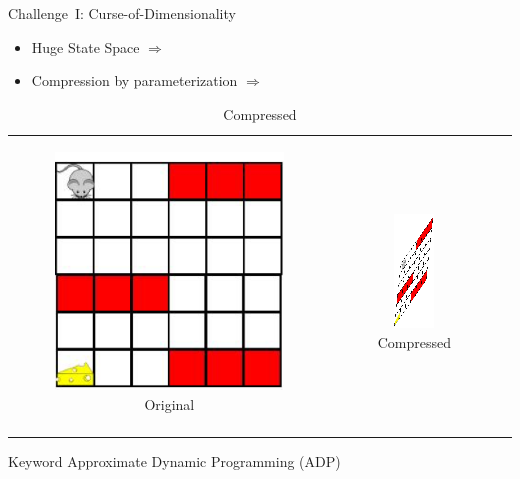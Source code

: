 \documentclass[10pt]{beamer}
\begin{document}
\begin{frame}[fragile]{Challenge~I: {Curse-of-Dimensionality}}

\begin{itemize}
\item Huge State Space $\Rightarrow$  {\color{orange}{Exact Decision $u^*$ not possible}}
\item Compression by parameterization $\Rightarrow$ {}
\end{itemize}

\begin{table}
\begin{tabular}{ccc}

\begin{minipage}{0.3\textwidth}
\begin{figure}
\includegraphics[scale=0.4]{mouse-single.png}
\caption*{Original}
\end{figure}
\end{minipage}
&
\begin{minipage}{0.3\textwidth}
\begin{figure}
\includegraphics[scale=0.4]{compress-mouse.png}
\caption*{Compressed }
\end{figure}
\end{minipage}
&
\begin{minipage}{0.3\textwidth}
\begin{block}{Open Question}
{\color{orange}{How bad is $\tu$ in comparison to $u^*$?}}\\
\end{block}
\end{minipage}

\end{tabular}
\end{table}


\begin{block}{Keyword}
Approximate Dynamic Programming (ADP)
\end{block}

\end{frame}
\end{document}
